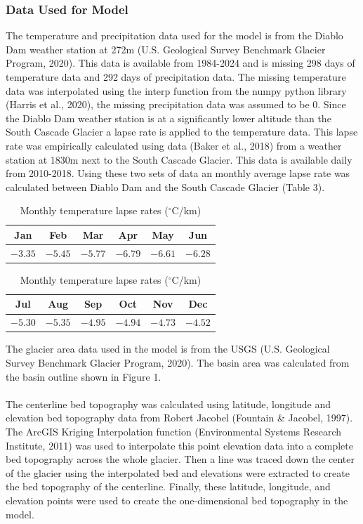\documentclass{article}
\begin{document}
\subsubsection{Data Used for Model}
The temperature and precipitation data used for the model is from the Diablo Dam weather station at 272m (U.S. Geological Survey Benchmark Glacier Program, 2020). This data is available from 1984-2024 
and is missing 298 days of temperature data and 292 days of precipitation data. The missing temperature data was interpolated 
using the interp function from the numpy python library (Harris et al., 2020), the missing precipitation data was assumed to be 0. Since the Diablo Dam
weather station is at a significantly lower altitude than the South Cascade Glacier a lapse rate is applied to the temperature data. This lapse 
rate was empirically calculated using data (Baker et al., 2018) from a weather station at 1830m next to the South Cascade Glacier. This data is available daily from 
2010-2018. Using these two sets of data an monthly average lapse rate was calculated between Diablo Dam and the South Cascade Glacier (Table 3). 
\begin{table}[h!]
    \centering
    \small
    \begin{tabular}{|*{6}{c|}}
      \hline
      Jan & Feb & Mar & Apr & May & Jun \\ 
      \hline
      $-3.35$ & $-5.45$ & $-5.77$ & $-6.79$ & $-6.61$ & $-6.28$ \\
      \hline
    \end{tabular}
    \begin{tabular}{|*{6}{c|}}
      \hline
      Jul & Aug & Sep & Oct & Nov & Dec \\ 
      \hline
      $-5.30$ & $-5.35$ & $-4.95$ & $-4.94$ & $-4.73$ & $-4.52$ \\
      \hline
    \end{tabular}
    \caption{Monthly temperature lapse rates ($^\circ$C/km)}
    \label{tab:temp_lapse_rates}
  \end{table}
\FloatBarrier
The glacier area data used in the model is from the USGS (U.S. Geological Survey Benchmark Glacier Program, 2020). The basin area was calculated from the basin outline shown in Figure 1.
\paragraph{}
The centerline bed topography was calculated using latitude, longitude and elevation bed topography data from Robert Jacobel (Fountain \& Jacobel, 1997). 
The ArcGIS Kriging Interpolation function (Environmental Systems Research Institute, 2011) was used to interpolate this point elevation data into a complete 
bed topography across the whole glacier. Then a line was traced down the center of the glacier using the interpolated bed and elevations 
were extracted to create the bed topography of the centerline. Finally, these latitude, longitude, and elevation points were used to create 
the one-dimensional bed topography in the model.
\end{document}
